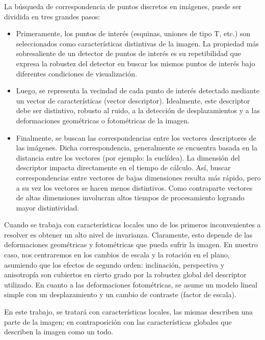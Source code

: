 La búsqueda de correspondencia de puntos discretos en imágenes, puede ser dividida en tres grandes pasos:
\begin{itemize}
 \item Primeramente, los puntos de interés (esquinas, uniones de tipo T, etc.) son seleccionados como características distintivas de la imagen. La propiedad más sobresaliente de un detector de puntos de interés es su repetibilidad que expresa la robustez del detector en buscar los mismos puntos de interés bajo diferentes condiciones de visualización.
 \item Luego, se representa la vecindad de cada punto de interés detectado mediante un vector de características (vector descriptor). Idealmente, este descriptor debe ser distintivo, robusto al ruido, a la detección de desplazamientos y a las deformaciones geométricas o fotométricas de la imagen.
 \item Finalmente, se buscan las correspondencias entre los vectores descriptores de las imágenes. Dicha correspondencia, generalmente se encuentra basada en la distancia entre los vectores (por ejemplo: la euclídea). La dimensión del descriptor impacta directamente en el tiempo de cálculo. Así, buscar correspondencias entre vectores de bajas dimensiones resulta más rápido, pero a su vez los vectores se hacen menos distintivos. Como contraparte vectores de altas dimensiones involucran altos tiempos de procesamiento logrando mayor distintividad.
\end{itemize}

Cuando se trabaja con características locales uno de los primeros inconvenientes a resolver es obtener un alto nivel de invarianza. Claramente, esto depende de las deformaciones geométricas y fotométricas que pueda sufrir la imagen. En nuestro caso, nos centraremos en los cambios de escala y la rotación en el plano, asumiendo que los efectos de segundo orden: inclinación, perspectiva y anisotropía son cubiertos en cierto grado por la robustez global del descriptor utilizado. En cuanto a las deformaciones fotométricas, se asume un modelo lineal simple con un desplazamiento y un cambio de contraste (factor de escala).

En este trabajo, se tratará con características locales, las mismas describen una parte de la imagen; en contraposición con las características globales que describen la imagen como un todo.

